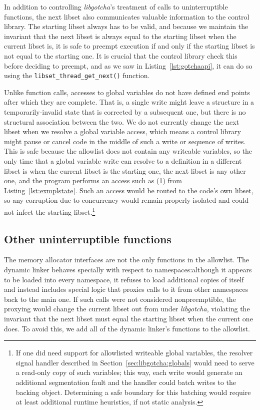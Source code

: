 In addition to controlling \textit{libgotcha}'s treatment of calls to uninterruptible
functions, the next libset also communicates valuable information to the control
library.  The starting libset always has to be valid, and because we maintain the
invariant that the next libset is always equal to the starting libset when the
current libset is, it is safe to preempt execution if and only if the starting libset
is not equal to the starting one.  It is crucial that the control library check this
before deciding to preempt, and as we saw in Listing~\ref{lst:gotchaapi}, it can do
so using the \texttt{libset\_thread\_get\_next()} function.

Unlike function calls, accesses to global variables do not have defined end points
after which they are complete.  That is, a single write might leave a structure in a
temporarily-invalid state that is corrected by a subsequent one, but there is no
structural association between the two.  We do not currently change the next libset
when we resolve a global variable access, which means a control library might pause
or cancel code in the middle of such a write or sequence of writes.  This is safe
because the allowlist does not contain any writeable variables, so the only time that
a global variable write can resolve to a definition in a different libset is when the
current libset is the starting one, the next libset is any other one, and the program
performs an access such as (1) from Listing~\ref{lst:exmplstate}.  Such an access
would be routed to the code's own libset, so any corruption due to concurrency would
remain properly isolated and could not infect the starting libset.\footnote{If one
did need support for allowlisted writeable global variables, the resolver signal
handler described in Section~\ref{sec:libgotcha:globals} would need to serve a
read-only copy of such variables; this way, each write would generate an additional
segmentation fault and the handler could batch writes to the backing object.
Determining a safe boundary for this batching would require at least additional
runtime heuristics, if not static analysis.}


\subsection{Other uninterruptible functions}
\label{sec:libgotcha:unintfuns}

The memory allocator interfaces are not the only functions in the allowlist.  The
dynamic linker behaves specially with respect to namespaces:\@ although it appears to
be loaded into every namespace, it refuses to load additional copies of itself and
instead includes special logic that proxies calls to it from other namespaces back to
the main one.  If such calls were not considered nonpreemptible, the proxying would
change the current libset out from under \textit{libgotcha}, violating the invariant
that the next libset must equal the starting libset when the current one does.  To
avoid this, we add all of the dynamic linker's functions to the allowlist.


